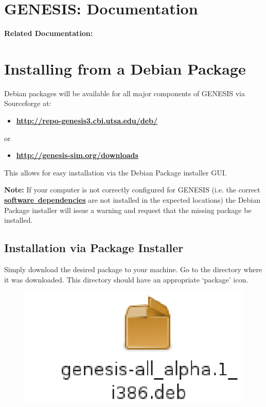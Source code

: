 \documentclass[12pt]{article}
\begin{document}
\section*{GENESIS: Documentation}

{\bf Related Documentation:}

\section*{Installing from a Debian Package}

Debian packages will be available for all major components of GENESIS via Sourceforge at:
\begin{itemize}
   \item[]\href{http://repo-genesis3.cbi.utsa.edu/deb/}{\bf {http://repo-genesis3.cbi.utsa.edu/deb/}}
\end{itemize}
\noindent or
\begin{itemize}
   \item[]\href{http://genesis-sim.org/downloads}{\bf http://genesis-sim.org/downloads}
\end{itemize}
This allows for easy installation via the Debian Package installer GUI.

{\bf Note:} If your computer is not correctly configured for GENESIS (i.e. the correct \href{../genesis-dependencies/genesis-dependencies.tex}{\bf software
\,dependencies} are not installed in the expected locations) the Debian Package installer will issue a warning and request that the missing package be installed.

\subsection*{Installation via Package Installer}

Simply download the desired package to your machine. Go to the directory where it was downloaded. This directory should have an appropriate `package' icon.

\begin{figure}[h]
   \centering
   \includegraphics[scale=1]{figures/install-user-deb-icon.eps}
\end{figure}
\end{document}

